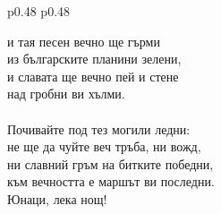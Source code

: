 \documentclass[12pt,a4paper]{article}
\begin{document}
\begin{tabular}{p{0.48\textwidth} p{0.48\textwidth}}
\begin{minipage}[t]{\linewidth}
и тая песен вечно ще гърми\\
из българските планини зелени,\\
и славата ще вечно пей и стене\\
\hspace*{1.5cm} над гробни ви хълми.\\
\\
Почивайте под тез могили ледни:\\
не ще да чуйте веч тръба, ни вожд,\\
ни славний гръм на битките победни,\\
към вечността е маршът ви последни.\\
\hspace*{1.5cm} Юнаци, лека нощ!\\
\end{minipage}
\end{tabular}
\end{document}
